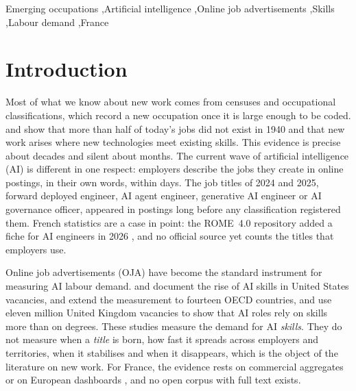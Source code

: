 \documentclass[5p,times,twocolumn,authoryear]{elsarticle}
\begin{document}
\begin{frontmatter}
\begin{keyword}
Emerging occupations \sep Artificial intelligence \sep Online job advertisements \sep Skills \sep Labour demand \sep France
\end{keyword}
\end{frontmatter}

\noindent{}

\section{Introduction}\label{sec:intro}
Most of what we know about new work comes from censuses and occupational classifications, which record a new occupation once it is large enough to be coded. \citet{lin2011} and \citet{autor2024} show that more than half of today's jobs did not exist in 1940 and that new work arises where new technologies meet existing skills. This evidence is precise about decades and silent about months. The current wave of artificial intelligence (AI) is different in one respect: employers describe the jobs they create in online postings, in their own words, within days. The job titles of 2024 and 2025, forward deployed engineer, AI agent engineer, generative AI engineer or AI governance officer, appeared in postings long before any classification registered them. French statistics are a case in point: the ROME~4.0 repository added a fiche for AI engineers in 2026 \citep{rome2026}, and no official source yet counts the titles that employers use.

Online job advertisements (OJA) have become the standard instrument for measuring AI labour demand. \citet{alekseeva2021} and \citet{acemoglu2022} document the rise of AI skills in United States vacancies, \citet{squicciarini2021} and \citet{borgonovi2023} extend the measurement to fourteen OECD countries, and \citet{bone2025} use eleven million United Kingdom vacancies to show that AI roles rely on skills more than on degrees. These studies measure the demand for AI \emph{skills}. They do not measure when a \emph{title} is born, how fast it spreads across employers and territories, when it stabilises and when it disappears, which is the object of the literature on new work. For France, the evidence rests on commercial aggregates \citep{pwc2025} or on European dashboards \citep{cedefop2019}, and no open corpus with full text exists.
\end{document}

